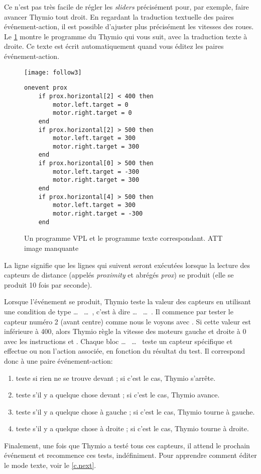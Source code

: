 
Ce n'est pas très facile de régler les \textit{sliders} précisément pour, par exemple, faire avancer Thymio tout droit.
En regardant la traduction textuelle des paires événement-action, il est possible d'ajuster plus précisément les vitesses des roues.
Le \cref{fig.textcode} montre le programme du Thymio qui vous suit, avec la traduction texte à droite.
Ce texte est écrit automatiquement quand vous éditez les paires événement-action.

\begin{figure}
\texttt{[image: follow3]}
\hfill
\begin{minipage}[b]{0.6\textwidth}
\footnotesize
\begin{lstlisting}
onevent prox
	if prox.horizontal[2] < 400 then
		motor.left.target = 0
		motor.right.target = 0
	end
	if prox.horizontal[2] > 500 then
		motor.left.target = 300
		motor.right.target = 300
	end
	if prox.horizontal[0] > 500 then
		motor.left.target = -300
		motor.right.target = 300
	end
	if prox.horizontal[4] > 500 then
		motor.left.target = 300
		motor.right.target = -300
	end
\end{lstlisting}
\end{minipage}
\caption{Un programme VPL et le programme texte correspondant. ATT image manquante}
\label{fig.textcode}
\end{figure}

La ligne  signifie que les lignes qui suivent seront exécutées lorsque la lecture des capteurs de distance (appelés \textit{proximity} et abrégés \textit{prox}) se produit (elle se produit 10 fois par seconde).

Lorsque l'événement se produit, Thymio teste la valeur des capteurs en utilisant une condition de type  \ldots \  \ldots \ , c'est à dire  \ldots \  \ldots \ .
Il commence par tester le capteur numéro 2 (avant centre) comme nous le voyons avec .
Si cette valeur est inférieure à 400, alors Thymio règle la vitesse des moteurs gauche et droite à 0 avec les instructions  et .
Chaque bloc  \ldots \  \ldots \  teste un capteur spécifique et effectue ou non l'action associée, en fonction du résultat du test.
Il correspond donc à une paire événement-action:
\begin{enumerate}[start=0]
	\item teste si rien ne se trouve devant ; si c'est le cas, Thymio s'arrête.
	\item teste s'il y a quelque chose devant ; si c'est le cas, Thymio avance.
	\item teste s'il y a quelque chose à gauche ; si c'est le cas, Thymio tourne à gauche.
	\item teste s'il y a quelque chose à droite ; si c'est le cas, Thymio tourne à droite.
\end{enumerate}
Finalement, une fois que Thymio a testé tous ces capteurs, il attend le prochain événement  et recommence ces tests, indéfiniment.
Pour apprendre comment éditer le mode texte, voir le \cref{c.next}.

